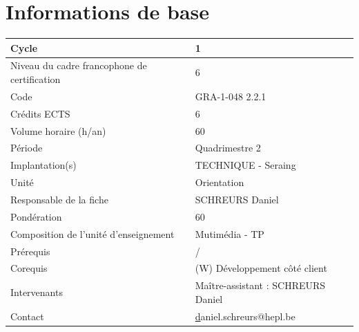 


\tableofcontents
{}



\clearpage
{}
\section{Informations de base}

\begin{table}[H]
    \begin{tabular}{|l|l|}
        \hline
        Cycle                                        & 1                                  \\ \hline
        Niveau du cadre francophone de certification & 6                                  \\ \hline
        Code                                         & GRA-1-048 2.2.1                    \\ \hline
        Crédits ECTS                                 & 6                                  \\ \hline
        Volume horaire (h/an)                        & 60                                 \\ \hline
        Période                                      & Quadrimestre 2                     \\ \hline
        Implantation(s)                              & TECHNIQUE - Seraing                \\ \hline
        Unité                                        & Orientation                        \\ \hline
        Responsable de la fiche                      & SCHREURS Daniel                    \\ \hline
        Pondération                                  & 60                                 \\ \hline
        Composition de l'unité d'enseignement        & Mutimédia - TP                     \\ \hline
        Prérequis                                    & /                                  \\ \hline
        Corequis                                     & (W) Développement côté client      \\ \hline
        Intervenants                                 & Maître-assistant : SCHREURS Daniel \\ \hline
        Contact                                      & {\ul daniel.schreurs@hepl.be}      \\ \hline
    \end{tabular}
\end{table}

